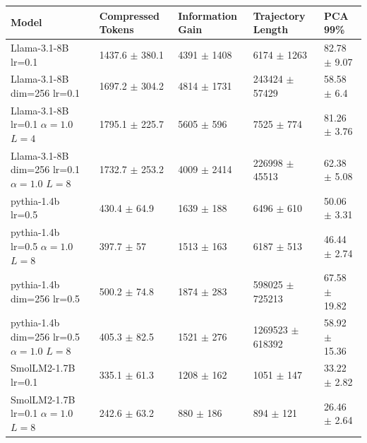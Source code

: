 \begin{tabular}{lllll}
\toprule
 Model                                                                              & Compressed Tokens           & Information Gain         & Trajectory Length             & PCA 99\%                    \\
\midrule
 Llama-3.1-8B {\small lr=0.1}                                                       & 1437.6 {\small $\pm$ 380.1} & 4391 {\small $\pm$ 1408} & 6174 {\small $\pm$ 1263}      & 82.78 {\small $\pm$ 9.07}  \\
 Llama-3.1-8B {\small dim=256} {\small lr=0.1}                                      & 1697.2 {\small $\pm$ 304.2} & 4814 {\small $\pm$ 1731} & 243424 {\small $\pm$ 57429}   & 58.58 {\small $\pm$ 6.4}   \\
 Llama-3.1-8B {\small lr=0.1} {\small $\alpha=1.0$} {\small $L=4$}                  & 1795.1 {\small $\pm$ 225.7} & 5605 {\small $\pm$ 596}  & 7525 {\small $\pm$ 774}       & 81.26 {\small $\pm$ 3.76}  \\
 Llama-3.1-8B {\small dim=256} {\small lr=0.1} {\small $\alpha=1.0$} {\small $L=8$} & 1732.7 {\small $\pm$ 253.2} & 4009 {\small $\pm$ 2414} & 226998 {\small $\pm$ 45513}   & 62.38 {\small $\pm$ 5.08}  \\
 \midrule
 pythia-1.4b {\small lr=0.5}                                                        & 430.4 {\small $\pm$ 64.9}   & 1639 {\small $\pm$ 188}  & 6496 {\small $\pm$ 610}       & 50.06 {\small $\pm$ 3.31}  \\
 pythia-1.4b {\small lr=0.5} {\small $\alpha=1.0$} {\small $L=8$}                   & 397.7 {\small $\pm$ 57}     & 1513 {\small $\pm$ 163}  & 6187 {\small $\pm$ 513}       & 46.44 {\small $\pm$ 2.74}  \\
 pythia-1.4b {\small dim=256} {\small lr=0.5}                                       & 500.2 {\small $\pm$ 74.8}   & 1874 {\small $\pm$ 283}  & 598025 {\small $\pm$ 725213}  & 67.58 {\small $\pm$ 19.82} \\
 pythia-1.4b {\small dim=256} {\small lr=0.5} {\small $\alpha=1.0$} {\small $L=8$}  & 405.3 {\small $\pm$ 82.5}   & 1521 {\small $\pm$ 276}  & 1269523 {\small $\pm$ 618392} & 58.92 {\small $\pm$ 15.36} \\
 \midrule
 SmolLM2-1.7B {\small lr=0.1}                                                       & 335.1 {\small $\pm$ 61.3}   & 1208 {\small $\pm$ 162}  & 1051 {\small $\pm$ 147}       & 33.22 {\small $\pm$ 2.82}  \\
 SmolLM2-1.7B {\small lr=0.1} {\small $\alpha=1.0$} {\small $L=8$}                  & 242.6 {\small $\pm$ 63.2}   & 880 {\small $\pm$ 186}   & 894 {\small $\pm$ 121}        & 26.46 {\small $\pm$ 2.64}  \\

\end{tabular}
